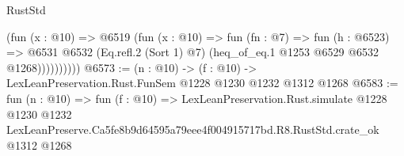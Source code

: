 \begin{lexlean}{RustStd}
\begin{coremodule}
                  (fun (x : @10) =>
                  @6519
                    (fun (x : @10) =>
                    fun (fn : @7) =>
                    fun (h : @6523) =>
                    @6531
                      @6532
                      (Eq.refl.{2} (Sort 1) @7)
                      (heq_of_eq.{1} @1253 @6529 @6532 @1268))))))))))
@6573 := (n : @10) -> (f : @10) -> LexLeanPreservation.Rust.FunSem @1228 @1230 @1232 @1312 @1268
@6583 := fun (n : @10) =>
  fun (f : @10) =>
  LexLeanPreservation.Rust.simulate
    @1228
    @1230
    @1232
    LexLeanPreserve.Ca5fe8b9d64595a79eee4f004915717bd.R8.RustStd.crate_ok
    @1312
    @1268
\end{coremodule}
\end{lexlean}
